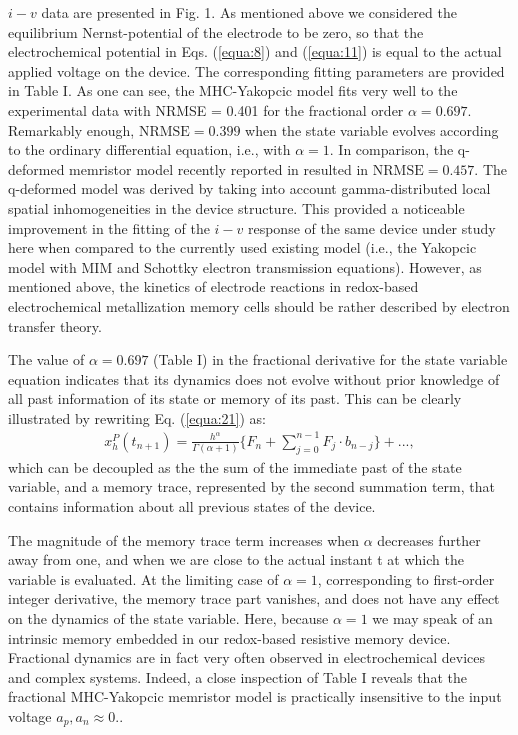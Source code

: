 \documentclass[10pt]{article}
\begin{document}
\begin{multicols}{2}
        \bigskip
        $i-v$ data are presented in Fig. 1. As mentioned above we considered the equilibrium Nernst-potential of the electrode to be zero, so that the electrochemical potential in Eqs. (\ref{equa:8}) and (\ref{equa:11}) is equal to the actual applied voltage on the device. The corresponding fitting parameters are provided in Table I. As one can see, the MHC-Yakopcic model fits very well to the experimental data with NRMSE = 0.401 for the fractional order $\alpha = 0.697$. Remarkably enough, $\text{NRMSE} = 0.399$ when the state variable evolves according to the ordinary differential equation, i.e., with $\alpha = 1$. In comparison, the q-deformed memristor model recently reported in resulted in $\text{NRMSE} = 0.457$. The q-deformed model was derived by taking into account gamma-distributed local spatial inhomogeneities in the device structure. This provided a noticeable improvement in the fitting of the $i-v$ response of the same device under study here when compared to the currently used existing model (i.e., the Yakopcic model with MIM and Schottky electron transmission equations). However, as mentioned above, the kinetics of electrode reactions in redox-based electrochemical metallization memory cells should be rather described by electron transfer theory. \par
        The value of $\alpha = 0.697$ (Table I) in the fractional derivative for the state variable equation indicates that its dynamics does not evolve without prior knowledge of all past information of its state or memory of its past. This can be clearly illustrated by rewriting Eq. (\ref{equa:21}) as:
        \begin{align}
            x_h^P (t_{n+1}) = \frac{h^\alpha}{\Gamma (\alpha + 1)} \biggl\{ F_n + \sum_{j=0}^{n-1} F_j \cdot b_{n-j} \biggr\} + ..., \label{equa:28}
        \end{align}
        which can be decoupled as the the sum of the immediate past of the state variable, and a memory trace, represented by the second summation term, that contains information about all previous states of the device.\par

        The magnitude of the memory trace term increases when $\alpha$ decreases further away from one, and when we are close to the actual instant t at which the variable is evaluated. At the limiting case of $\alpha = 1$, corresponding to first-order integer derivative, the memory trace part vanishes, and does not have any effect on the dynamics of the state variable. Here, because $\alpha = 1$ we may speak of an intrinsic memory embedded in our redox-based resistive memory device. Fractional dynamics are in fact very often observed in electrochemical devices and complex systems. Indeed, a close inspection of Table I reveals that the fractional MHC-Yakopcic memristor model is practically insensitive to the input voltage $a_p, a_n \approx 0.$.
        \\
        \par
        {\centering
}
\end{multicols}
\end{document}
